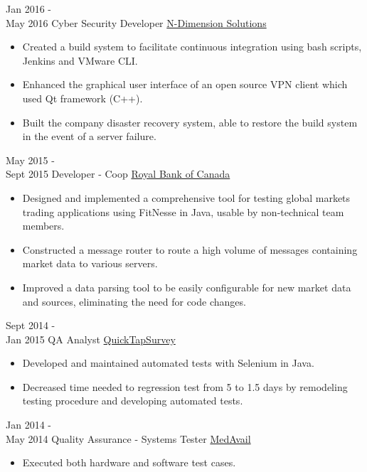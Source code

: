 \documentclass[letterpaper]{twentysecondcv} %
\begin{document}
\begin{twenty}
    \twentyitem
   		{Jan 2016 - \\ May 2016}
        {Cyber Security Developer}
        {\href{https://www.n-dimension.com}{N-Dimension Solutions}}
        {}
        {
        {\begin{itemize}
        \item Created a build system to facilitate continuous integration using bash scripts, Jenkins and VMware CLI.
        \item Enhanced the graphical user interface of an open source VPN client which used Qt framework (C++).
        \item Built the company disaster recovery system, able to restore the build system in the event of a server failure.
    \end{itemize}}
        }
        
     \twentyitem
   		{May 2015 - \\ Sept 2015}
        {Developer - Coop}
        {\href{https://www.rbcwealthmanagement.com}{Royal Bank of Canada}}
        {}
        {
        \begin{itemize}
        \item Designed and implemented a comprehensive tool for testing global markets trading applications using FitNesse in Java, usable by non-technical team members.
        \item Constructed a message router to route a high volume of messages containing market data to various servers.
        \item Improved a data parsing tool to be easily configurable for new market data and sources, eliminating the need for code changes.
    \end{itemize}
    	}
    	
    \twentyitem
   		{Sept 2014 - \\ Jan 2015}
        {QA Analyst}
        {\href{http://www1.quicktapsurvey.com}{QuickTapSurvey}}
        {}
        {
        {\begin{itemize}
        \item Developed and maintained automated tests with Selenium in Java.
        \item Decreased time needed to regression test from 5 to 1.5 days by remodeling testing procedure and developing automated tests.
    \end{itemize}}
        }
        
    \twentyitem
   		{Jan 2014 - \\ May 2014}
        {Quality Assurance - Systems Tester}
        {\href{http://medavail.com}{MedAvail}}
        {}
        {
        {\begin{itemize}
        \item Executed both hardware and software test cases.
    \end{itemize}}
        }
        
\end{twenty}
\end{document}

